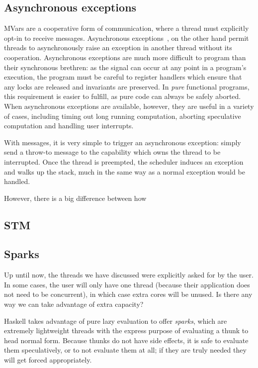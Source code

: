 \subsection{Asynchronous exceptions}

MVars are a cooperative form of communication, where a thread must
explicitly opt-in to receive messages.  Asynchronous
exceptions~\cite{Marlow:2001:AEH:378795.378858}, on the other hand
permit threads to asynchronously raise an exception in another thread
without its cooperation.  Asynchronous exceptions are much more
difficult to program than their synchronous brethren: as the signal can
occur at any point in a program's execution, the program must be careful
to register handlers which ensure that any locks are released and
invariants are preserved.  In \emph{pure} functional programs, this requirement
is easier to fulfill, as pure code can always be safely aborted.  When
asynchronous exceptions are available, however, they are useful
in a variety of cases, including timing out long running computation,
aborting speculative computation and handling user interrupts.

With messages, it is very simple to trigger an asynchronous exception:
simply send a throw-to message to the capability which owns the thread
to be interrupted.  Once the thread is preempted, the scheduler induces
an exception and walks up the stack, much in the same way as a normal
exception would be handled.

However, there is a big difference between how 

\subsection{STM}

\subsection{Sparks}

Up until now, the threads we have discussed were explicitly asked for
by the user.  In some cases, the user will only have one thread (because
their application does not need to be concurrent), in which case extra
cores will be unused.  Is there any way we can take advantage of extra
capacity?

Haskell takes advantage of pure lazy evaluation to offer \emph{sparks},
which are extremely lightweight threads with the express purpose of
evaluating a thunk to head normal form.  Because thunks do not have
side effects, it is safe to evaluate them speculatively, or to not
evaluate them at all; if they are truly needed they will get forced
appropriately.

